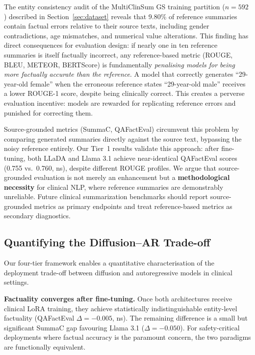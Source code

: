 \documentclass[11pt]{article}
\begin{document}
The entity consistency audit of the MultiClinSum GS training partition
($n=592$) described in Section~\ref{sec:dataset} reveals that 9.80\% of
reference summaries contain factual errors relative to their source texts,
including gender contradictions, age mismatches, and numerical value
alterations. This finding has direct consequences for evaluation design: if
nearly one in ten reference summaries is itself factually incorrect, any
reference-based metric (ROUGE, BLEU, METEOR, BERTScore) is fundamentally
\emph{penalising models for being more factually accurate than the
reference}. A model that correctly generates ``29-year-old female'' when
the erroneous reference states ``29-year-old male'' receives a lower ROUGE-1
score, despite being clinically correct. This creates a perverse evaluation
incentive: models are rewarded for replicating reference errors and punished
for correcting them.

Source-grounded metrics (SummaC, QAFactEval) circumvent this problem by
comparing generated summaries directly against the source text, bypassing
the noisy reference entirely. Our Tier~1 results validate this approach:
after fine-tuning, both LLaDA and Llama 3.1 achieve near-identical
QAFactEval scores (0.755 vs.\ 0.760, ns), despite different ROUGE profiles.
We argue that source-grounded evaluation is not merely an enhancement but a
\textbf{methodological necessity} for clinical NLP, where reference
summaries are demonstrably unreliable. Future clinical summarization
benchmarks should report source-grounded metrics as primary endpoints and
treat reference-based metrics as secondary diagnostics.

\subsection{Quantifying the Diffusion--AR Trade-off}

Our four-tier framework enables a quantitative characterisation of the
deployment trade-off between diffusion and autoregressive models in clinical
settings.

\textbf{Factuality converges after fine-tuning.} Once both architectures
receive clinical LoRA training, they achieve statistically indistinguishable
entity-level factuality (QAFactEval $\Delta = -0.005$, ns).
The remaining difference is a small but significant SummaC gap favouring
Llama 3.1 ($\Delta = -0.050$). For safety-critical deployments where factual
accuracy is the paramount concern, the two paradigms are functionally
equivalent.
\end{document}
